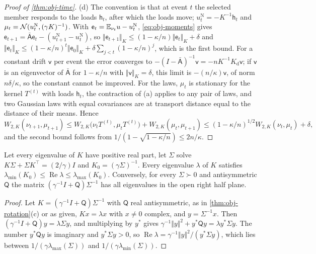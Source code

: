 \begin{proof}[Proof of \cref{thm:obj-time}]
(d) The convention is that at event $t$ the selected member responds to the loads $\mathsf h_t$, after which the loads move; $u^{\mathrm N}_t=-K^{-1}\mathsf h_t$ and $\mu_t=\mathcal{N}(u^{\mathrm N}_t,(\gamma K)^{-1})$. With $\mathsf e_t=\mathbb{E}_{\nu_t}u-u^{\mathrm N}_t$, \eqref{eq:obj-moments} gives $\mathsf e_{t+1}=\bar{\mathsf A}\mathsf e_t-(u^{\mathrm N}_{t+1}-u^{\mathrm N}_t)$, so $\Vert\mathsf e_{t+1}\Vert_K\le(1-\kappa/n)\Vert\mathsf e_t\Vert_K+\delta$ and $\Vert\mathsf e_t\Vert_K\le(1-\kappa/n)^t\Vert\mathsf e_0\Vert_K+\delta\sum_{j<t}(1-\kappa/n)^j$, which is the first bound. For a constant drift $\mathsf v$ per event the error converges to $-(I-\bar{\mathsf A})^{-1}\mathsf v=-nK^{-1}K_{\mathrm d}\mathsf v$; if $\mathsf v$ is an eigenvector of $\bar{\mathsf A}$ for $1-\kappa/n$ with $\Vert\mathsf v\Vert_K=\delta$, this limit is $-(n/\kappa)\mathsf v$, of norm $n\delta/\kappa$, so the constant cannot be improved. For the laws, $\mu_t$ is stationary for the kernel $T^{(t)}$ with loads $\mathsf h_t$, the contraction of (a) applies to any pair of laws, and two Gaussian laws with equal covariances are at transport distance equal to the distance of their means. Hence
\begin{equation*}
W_{2,K}(\nu_{t+1},\mu_{t+1})\le W_{2,K}\bigl(\nu_tT^{(t)},\mu_tT^{(t)}\bigr)+W_{2,K}(\mu_t,\mu_{t+1})\le(1-\kappa/n)^{1/2}W_{2,K}(\nu_t,\mu_t)+\delta,
\end{equation*}
and the second bound follows from $1/(1-\sqrt{1-\kappa/n})\le2n/\kappa$.
\end{proof}

\begin{proposition}\label{prop:obj-langevin-rate}
Let every eigenvalue of $K$ have positive real part, let $\Sigma$ solve $K\Sigma+\Sigma K^\top=(2/\gamma)I$ and $K_0=(\gamma\Sigma)^{-1}$. Every eigenvalue $\lambda$ of $K$ satisfies $\lambda_{\min}(K_0)\le\operatorname{Re}\lambda\le\lambda_{\max}(K_0)$. Conversely, for every $\Sigma\succ0$ and antisymmetric $\mathsf Q$ the matrix $(\gamma^{-1}I+\mathsf Q)\Sigma^{-1}$ has all eigenvalues in the open right half plane.
\end{proposition}

\begin{proof}
Let $K=(\gamma^{-1}I+\mathsf Q)\Sigma^{-1}$ with $\mathsf Q$ real antisymmetric, as in \cref{thm:obj-rotation}(c) or as given, $Kx=\lambda x$ with $x\neq0$ complex, and $y=\Sigma^{-1}x$. Then $(\gamma^{-1}I+\mathsf Q)y=\lambda\Sigma y$, and multiplying by $y^\ast$ gives $\gamma^{-1}\Vert y\Vert^2+y^\ast\mathsf Qy=\lambda y^\ast\Sigma y$. The number $y^\ast\mathsf Qy$ is imaginary and $y^\ast\Sigma y>0$, so $\operatorname{Re}\lambda=\gamma^{-1}\Vert y\Vert^2/(y^\ast\Sigma y)$, which lies between $1/(\gamma\lambda_{\max}(\Sigma))$ and $1/(\gamma\lambda_{\min}(\Sigma))$.
\end{proof}


